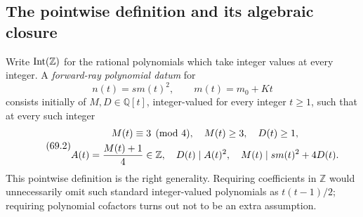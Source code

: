 \documentclass[10pt,reqno]{amsart}
\theoremstyle{definition}
\newcommand{\1}{\mathbf 1}
\begin{document}
\subsection{The pointwise definition and its algebraic closure}
Write ${\rm Int}(\mathbb Z)$ for the rational polynomials which take integer
values at every integer.  A \emph{forward-ray polynomial datum} for
\begin{equation}\tag{69.1}
 n(t)=s m(t)^2,\qquad m(t)=m_0+Kt
\end{equation}
consists initially of $M,D\in\mathbb Q[t]$, integer-valued for every integer
$t\geq1$, such that at every such integer
\begin{equation}\tag{69.2}
\begin{gathered}
 M(t)\equiv3\pmod4,\quad M(t)\geq3,\quad D(t)\geq1,\\
 A(t)={M(t)+1\over4}\in\mathbb Z,\quad
 D(t)\mid A(t)^2,\quad M(t)\mid s m(t)^2+4D(t).
\end{gathered}
\end{equation}
This pointwise definition is the right generality.  Requiring coefficients in
$\mathbb Z$ would unnecessarily omit such standard integer-valued
polynomials as $t(t-1)/2$; requiring polynomial cofactors turns out not to
be an extra assumption.
\end{document}
